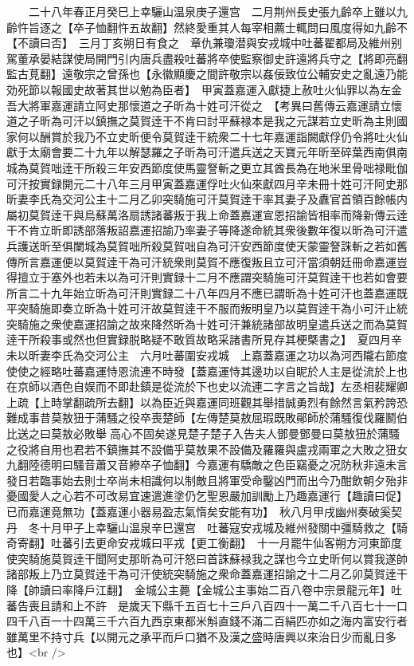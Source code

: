 　　二十八年春正月癸巳上幸驪山温泉庚子還宫　二月荆州長史張九齡卒上雖以九齡忤旨逐之【卒子恤翻忤五故翻】然終愛重其人每宰相薦士輒問曰風度得如九齡不【不讀曰否】　三月丁亥朔日有食之　章仇兼瓊潜與安戎城中吐蕃翟都局及維州别駕董承晏結謀使局開門引内唐兵盡殺吐蕃將卒使監察御史許遠將兵守之【將即亮翻監古莧翻】遠敬宗之曾孫也【永徽顯慶之間許敬宗以姦佞致位公輔安史之亂遠乃能効死節以報國史故著其世以勉為臣者】　甲寅蓋嘉運入獻捷上赦吐火仙罪以為左金吾大將軍嘉運請立阿史那懷道之子昕為十姓可汗從之　【考異曰舊傳云嘉運請立懷道之子昕為可汗以鎮撫之莫賀逹干不肯曰討平蘇禄本是我之元謀若立史昕為主則國家何以酬賞於我乃不立史昕便令莫賀逹干統衆二十七年嘉運詣闕獻俘仍令將吐火仙獻于太廟會要二十九年以解瑟羅之子昕為可汗遣兵送之天寶元年昕至碎葉西南俱南城為莫賀咄逹干所殺三年安西節度使馬靈詧斬之更立其酋長為在地米里骨咄禄毗伽可汗按實録開元二十八年三月甲寅蓋嘉運俘吐火仙來獻四月辛未冊十姓可汗阿史那昕妻李氏為交河公主十二月乙卯突騎施可汗莫賀逹干率其妻子及纛官首領百餘帳内屬初莫賀逹干與烏蘇萬洛扇誘諸蕃叛于我上命蓋嘉運宣恩招諭皆相率而降新傳云逹干不肯立昕即誘部落叛詔嘉運招諭乃率妻子等降遂命統其衆後數年復以昕為可汗遣兵護送昕至俱闌城為莫賀咄所殺莫賀咄自為可汗安西節度使天蒙靈詧誅斬之若如舊傳所言嘉運便以莫賀逹干為可汗統衆則莫賀不應復叛且立可汗當須朝廷冊命嘉運豈得擅立于塞外也若未以為可汗則實録十二月不應謂突騎施可汗莫賀逹干也若如會要所言二十九年始立昕為可汗則實録二十八年四月不應已謂昕為十姓可汗也蓋嘉運既平突騎施即奏立昕為十姓可汗故莫賀逹干不服而叛明皇乃以莫賀逹干為小可汗止統突騎施之衆使嘉運招諭之故來降然昕為十姓可汗兼統諸部故明皇遣兵送之而為莫賀逹干所殺事或然也但實録脱略疑不敢質故略采諸書所見存其梗槩書之】　夏四月辛未以昕妻李氏為交河公主　六月吐蕃圍安戎城　上嘉蓋嘉運之功以為河西隴右節度使使之經略吐蕃嘉運恃恩流連不時發【蓋嘉運恃其邊功以自眤於人主是從流於上也在京師以酒色自娱而不即赴鎮是從流於下也史以流連二字言之旨哉】左丞相裴耀卿上疏【上時掌翻疏所去翻】以為臣近與嘉運同班觀其舉措誠勇烈有餘然言氣矜誇恐難成事昔莫敖狃于蒲騷之役卒喪楚師【左傳楚莫敖屈瑕既敗鄖師於蒲騷復伐羅鬭伯比送之曰莫敖必敗舉高心不固矣遂見楚子楚子入告夫人鄧曼鄧曼曰莫敖狃於蒲騷之役將自用也君若不鎮撫其不設備乎莫敖果不設備及羅羅與盧戎兩軍之大敗之狃女九翻陸德明曰騷音蕭又音縿卒子恤翻】今嘉運有驕敵之色臣竊憂之况防秋非遠未言發日若臨事始去則士卒尚未相識何以制敵且將軍受命鑿凶門而出今乃酣飲朝夕殆非憂國愛人之心若不可改易宜速遣進塗仍乞聖恩嚴加訓勵上乃趣嘉運行【趣讀曰促】已而嘉運竟無功【蓋嘉運小器易盈志氣惰矣安能有功】　秋八月甲戌幽州奏破奚契丹　冬十月甲子上幸驪山温泉辛巳還宫　吐蕃寇安戎城及維州發關中彊騎救之【騎奇寄翻】吐蕃引去更命安戎城曰平戎【更工衡翻】　十一月罷牛仙客朔方河東節度使突騎施莫賀逹干聞阿史那昕為可汗怒曰首誅蘇禄我之謀也今立史昕何以賞我遂帥諸部叛上乃立莫賀逹干為可汗使統突騎施之衆命蓋嘉運招諭之十二月乙卯莫賀逹干降【帥讀曰率降戶江翻】　金城公主薨【金城公主事始二百八卷中宗景龍元年】吐蕃告喪且請和上不許　是歲天下縣千五百七十三戶八百四十一萬二千八百七十一口四千八百一十四萬三千六百九西京東都米斛直錢不滿二百絹匹亦如之海内富安行者雖萬里不持寸兵【以開元之承平而戶口猶不及漢之盛時唐興以來治日少而亂日多也】<br />
